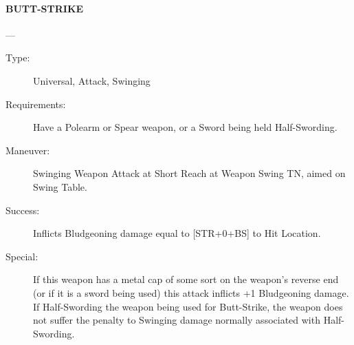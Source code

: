 \documentclass[oneside,11pt,english]{book}
\begin{document}
\paragraph{\large\label{man:BUTT-STRIKE} BUTT-STRIKE}---\quad{\large[X]}
\begin{description}
\item [Type:] Universal, Attack, Swinging 
\item [Requirements:] Have a Polearm or Spear weapon, or a Sword being held Half-Swording. 
\item [Maneuver:] Swinging Weapon Attack at Short Reach at Weapon Swing TN, aimed on Swing Table. 
\item [Success:] Inflicts Bludgeoning damage equal to [STR+0+BS] to Hit Location. 
\item [Special:] If this weapon has a metal cap of some sort on the weapon’s reverse end (or if it is a sword being used) this attack inflicts +1 Bludgeoning damage.  If Half-Swording the weapon being used for Butt-Strike, the weapon does not suffer the penalty to Swinging damage normally associated with Half-Swording. 
\end{description}
\end{document}
